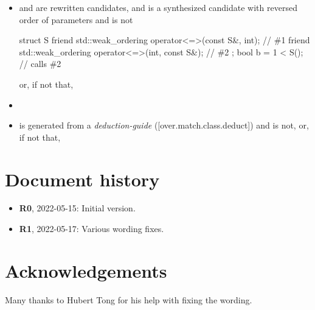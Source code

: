 \begin{adjustwidth}{0cm}{0.5cm}
\begin{itemize}
\item
{} and  are rewritten candidates, and
 is a synthesized candidate
with reversed order of parameters
and  is not
\begin{example}
\begin{codeblock}
struct S {
  friend std::weak_ordering operator<=>(const S&, int);         // \#1
  friend std::weak_ordering operator<=>(int, const S&);         // \#2
};
bool b = 1 < S();                                               // calls \#2
\end{codeblock}
\end{example}
or, if not that,


\item {}

\item
{} is generated from a
\emph{deduction-guide} ([over.match.class.deduct])
and  is not, or, if not that,
\end{itemize}
\end{adjustwidth}


\section*{Document history}

\begin{itemize}
\item \textbf{R0}, 2022-05-15: Initial version.
\item \textbf{R1}, 2022-05-17: Various wording fixes.
\end{itemize}


\section*{Acknowledgements}

Many thanks to Hubert Tong for his help with fixing the wording.


\renewcommand{\bibname}{References}



